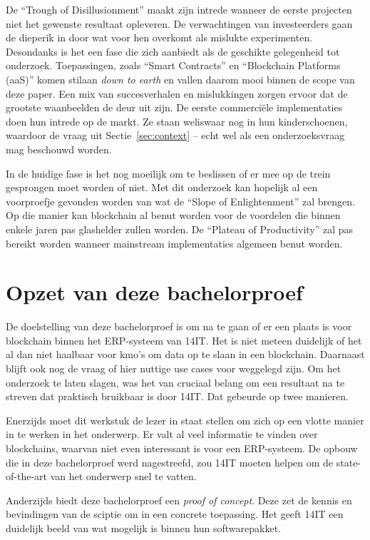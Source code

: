 De ``Trough of Disillusionment'' maakt zijn intrede wanneer de eerste projecten niet het gewenste resultaat opleveren.
De verwachtingen van investeerders gaan de dieperik in door wat voor hen overkomt als mislukte experimenten. Desondanks is het een fase die zich aanbiedt als de geschikte gelegenheid tot onderzoek. Toepassingen, zoals ``Smart Contracts'' en ``Blockchain Platforms (aaS)'' komen stilaan \textit{down to earth} en vallen daarom mooi binnen de scope van deze paper. Een mix van succesverhalen en mislukkingen zorgen ervoor dat de grootste waanbeelden de deur uit zijn. De eerste commerciële implementaties doen hun intrede op de markt. Ze staan weliswaar nog in hun kinderschoenen, waardoor de vraag uit Sectie~\ref{sec:context} --  echt wel als een onderzoeksvraag mag beschouwd worden. 

In de huidige fase is het nog moeilijk om te beslissen of er mee op de trein gesprongen moet worden of niet. Met dit onderzoek kan hopelijk al een voorproefje gevonden worden van wat de ``Slope of Enlightenment'' zal brengen. Op die manier kan blockchain al benut worden voor de voordelen die binnen enkele jaren pas glashelder zullen worden. De ``Plateau of Productivity'' zal pas bereikt worden wanneer mainstream implementaties algemeen benut worden.

\newpage

\section{Opzet van deze bachelorproef}
\label{sec:opzet-van-deze-bachelorproef}


De doelstelling van deze bachelorproef is om na te gaan of er een plaats is voor blockchain binnen het ERP-systeem van 14IT. Het is niet meteen duidelijk of het al dan niet haalbaar voor kmo's om data op te slaan in een blockchain. Daarnaast blijft ook nog de vraag of hier nuttige use cases voor weggelegd zijn. Om het onderzoek te laten slagen, was het van cruciaal belang om een resultaat na te streven dat praktisch bruikbaar is door 14IT. Dat gebeurde op twee manieren. 

Enerzijds moet dit werkstuk de lezer in staat stellen om zich op een vlotte manier in te werken in het onderwerp. Er valt al veel informatie te vinden over blockchains, waarvan niet even interessant is voor een ERP-systeem. De opbouw die in deze bachelorproef werd nagestreefd, zou 14IT moeten helpen om de state-of-the-art van het onderwerp snel te vatten.

Anderzijds biedt deze bachelorproef een \textit{proof of concept}. Deze zet de kennis en bevindingen van de sciptie om in een concrete toepassing. Het geeft 14IT een duidelijk beeld van wat mogelijk is binnen hun softwarepakket.

